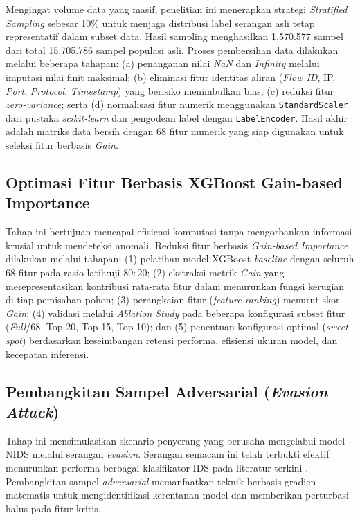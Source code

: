 \documentclass[10pt,twocolumn,a4paper]{extarticle}
\begin{document}
Mengingat volume data yang masif, penelitian ini menerapkan strategi \textit{Stratified Sampling} sebesar 10\% untuk menjaga distribusi label serangan asli tetap representatif dalam subset data. Hasil sampling menghasilkan 1.570.577 sampel dari total 15.705.786 sampel populasi asli. Proses pembersihan data dilakukan melalui beberapa tahapan: (a) penanganan nilai \textit{NaN} dan \textit{Infinity} melalui imputasi nilai finit maksimal; (b) eliminasi fitur identitas aliran (\textit{Flow ID}, IP, \textit{Port}, \textit{Protocol}, \textit{Timestamp}) yang berisiko menimbulkan bias; (c) reduksi fitur \textit{zero-variance}; serta (d) normalisasi fitur numerik menggunakan \texttt{StandardScaler} dari pustaka \textit{scikit-learn} \citep{ref_sklearn} dan pengodean label dengan \texttt{LabelEncoder}. Hasil akhir adalah matriks data bersih dengan 68 fitur numerik yang siap digunakan untuk seleksi fitur berbasis \textit{Gain}.

\subsection{Optimasi Fitur Berbasis XGBoost Gain-based Importance}
Tahap ini bertujuan mencapai efisiensi komputasi tanpa mengorbankan informasi krusial untuk mendeteksi anomali. Reduksi fitur berbasis \textit{Gain-based Importance} \citep{ref_xgboost} dilakukan melalui tahapan: (1) pelatihan model XGBoost \citep{ref_xgboost} \textit{baseline} dengan seluruh 68 fitur pada rasio latih:uji $80:20$; (2) ekstraksi metrik \textit{Gain} yang merepresentasikan kontribusi rata-rata fitur dalam menurunkan fungsi kerugian di tiap pemisahan pohon; (3) perangkaian fitur (\textit{feature ranking}) menurut skor \textit{Gain}; (4) validasi melalui \textit{Ablation Study} pada beberapa konfigurasi subset fitur (\textit{Full}/68, Top-20, Top-15, Top-10); dan (5) penentuan konfigurasi optimal (\textit{sweet spot}) berdasarkan keseimbangan retensi performa, efisiensi ukuran model, dan kecepatan inferensi.

\subsection{Pembangkitan Sampel Adversarial (\textit{Evasion Attack})}
Tahap ini mensimulasikan skenario penyerang yang berusaha mengelabui model NIDS melalui serangan \textit{evasion}. Serangan semacam ini telah terbukti efektif menurunkan performa berbagai klasifikator IDS pada literatur terkini \citep{ref_demgan,ref_evasiongan}. Pembangkitan sampel \textit{adversarial} memanfaatkan teknik berbasis gradien matematis untuk mengidentifikasi kerentanan model dan memberikan perturbasi halus pada fitur kritis.
\end{document}
